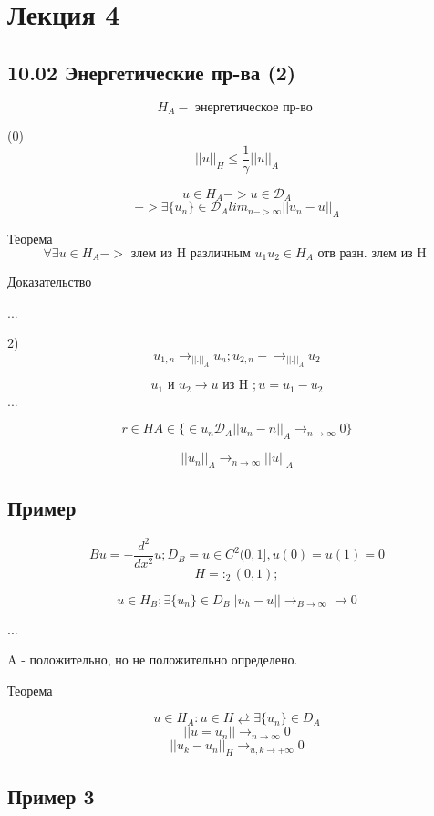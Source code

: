 \documentclass[12pt, a4paper]{article}
\begin{document}
\section{Лекция 4}

\subsection{10.02 Энергетические пр-ва (2)}

\[ H_A -\textrm{ энергетическое пр-во } \]

(0) \[ {||u||}_H \leq \frac{1}{\gamma   } {||u||}_A \]

\[ u \in H_A -> u \in \mathcal{D}_A \]
\[ -> \exists \{ u_n \} \in \mathcal{D}_A  {lim}_{n-> \infty} || u_n-u||_A \]

Теорема 
\[ \forall \exists u \in H_A -> \textrm{  злем из H различным } u_1 u_2 \in H_A \textrm{ отв разн. злем из H }\]

Доказательство 

...

2) \[  u_{1, n} \rightarrow_{||.||_A} u_n; u_{2,n} -\rightarrow_{||.||_A} u_2\]

\[ u_1 \textrm{ и  } u_2 \rightarrow u \textrm{ из H }; u = u_1 - u_2\]
...

\[  r \in H A \in \{ \in u_n \mathcal{D}_A ||u_n -n ||_A \rightarrow_{n \rightarrow \infty} 0 \} \]

\[ || u_n ||_A \rightarrow_{n \rightarrow \infty} ||u||_A \]



\subsection{Пример}

\[ Bu = - \frac{d^2}{d x^2} u ; D_{B} = {u \in C^2 (0,1]}, u(0) = u(1) = 0 \]
\[ H = :_2 (0, 1); \]

\[ u \in H_B; \exists \{ u_n \} \in D_B || u_h - u || \rightarrow_{B \rightarrow \infty} \rightarrow 0\]

...

A - положительно, но не положительно определено.

Теорема

\[ u \in H_A : u \in H \rightleftarrows \exists \{ u_n \} \in D_A \]
\[ || u = u_n || \rightarrow_{n \rightarrow \infty} 0 \]
\[ || u_k - u_n ||_H \rightarrow_{u,k \rightarrow + \infty} 0 \]

\subsection{Пример 3}
\end{document}
